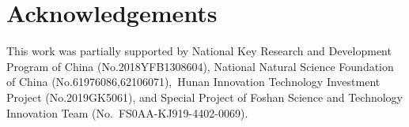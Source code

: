 \documentclass[final,3p,times,twocolumn]{elsarticle}
\begin{document}
\section*{Acknowledgements}This work was partially supported by National Key Research and Development Program of China (No.2018YFB1308604), National Natural Science Foundation of China (No.61976086,62106071), Hunan Innovation Technology Investment Project (No.2019GK5061), and Special Project of Foshan Science and Technology Innovation Team (No. FS0AA-KJ919-4402-0069).
\label{}





 

%
%
%
%
\end{document}
